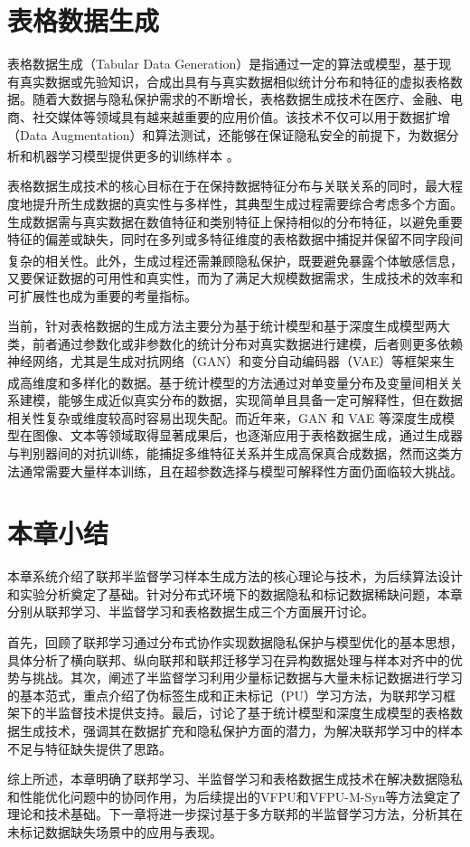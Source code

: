 \section{表格数据生成}


表格数据生成（Tabular Data Generation）是指通过一定的算法或模型，基于现有真实数据或先验知识，合成出具有与真实数据相似统计分布和特征的虚拟表格数据。随着大数据与隐私保护需求的不断增长，表格数据生成技术在医疗、金融、电商、社交媒体等领域具有越来越重要的应用价值。该技术不仅可以用于数据扩增（Data Augmentation）和算法测试，还能够在保证隐私安全的前提下，为数据分析和机器学习模型提供更多的训练样本 \textsuperscript{\cite{li2021survey}}。

表格数据生成技术的核心目标在于在保持数据特征分布与关联关系的同时，最大程度地提升所生成数据的真实性与多样性，其典型生成过程需要综合考虑多个方面。生成数据需与真实数据在数值特征和类别特征上保持相似的分布特征，以避免重要特征的偏差或缺失，同时在多列或多特征维度的表格数据中捕捉并保留不同字段间复杂的相关性\textsuperscript{\cite{zhang2020tab}}。此外，生成过程还需兼顾隐私保护，既要避免暴露个体敏感信息，又要保证数据的可用性和真实性，而为了满足大规模数据需求，生成技术的效率和可扩展性也成为重要的考量指标。


当前，针对表格数据的生成方法主要分为基于统计模型和基于深度生成模型两大类，前者通过参数化或非参数化的统计分布对真实数据进行建模，后者则更多依赖神经网络，尤其是生成对抗网络（GAN）和变分自动编码器（VAE）等框架来生成高维度和多样化的数据\textsuperscript{\cite{brown2019differential}}。基于统计模型的方法通过对单变量分布及变量间相关关系建模，能够生成近似真实分布的数据，实现简单且具备一定可解释性，但在数据相关性复杂或维度较高时容易出现失配。而近年来，GAN 和 VAE 等深度生成模型在图像、文本等领域取得显著成果后，也逐渐应用于表格数据生成，通过生成器与判别器间的对抗训练，能捕捉多维特征关系并生成高保真合成数据，然而这类方法通常需要大量样本训练，且在超参数选择与模型可解释性方面仍面临较大挑战。




\section{本章小结}
本章系统介绍了联邦半监督学习样本生成方法的核心理论与技术，为后续算法设计和实验分析奠定了基础。针对分布式环境下的数据隐私和标记数据稀缺问题，本章分别从联邦学习、半监督学习和表格数据生成三个方面展开讨论。

首先，回顾了联邦学习通过分布式协作实现数据隐私保护与模型优化的基本思想，具体分析了横向联邦、纵向联邦和联邦迁移学习在异构数据处理与样本对齐中的优势与挑战。其次，阐述了半监督学习利用少量标记数据与大量未标记数据进行学习的基本范式，重点介绍了伪标签生成和正未标记（PU）学习方法，为联邦学习框架下的半监督技术提供支持。最后，讨论了基于统计模型和深度生成模型的表格数据生成技术，强调其在数据扩充和隐私保护方面的潜力，为解决联邦学习中的样本不足与特征缺失提供了思路。

综上所述，本章明确了联邦学习、半监督学习和表格数据生成技术在解决数据隐私和性能优化问题中的协同作用，为后续提出的VFPU和VFPU-M-Syn等方法奠定了理论和技术基础。下一章将进一步探讨基于多方联邦的半监督学习方法，分析其在未标记数据缺失场景中的应用与表现。
